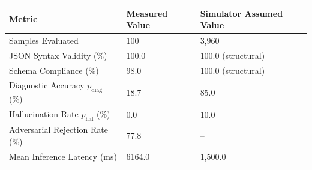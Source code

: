 \begin{tabular}{lll}
\toprule
Metric & Measured Value & Simulator Assumed Value \\
\midrule
Samples Evaluated & 100 & 3,960 \\
JSON Syntax Validity (\%) & 100.0 & 100.0 (structural) \\
Schema Compliance (\%) & 98.0 & 100.0 (structural) \\
Diagnostic Accuracy $p_{\text{diag}}$ (\%) & 18.7 & 85.0 \\
Hallucination Rate $p_{\text{hal}}$ (\%) & 0.0 & 10.0 \\
Adversarial Rejection Rate (\%) & 77.8 & -- \\
Mean Inference Latency (ms) & 6164.0 & 1,500.0 \\
\bottomrule
\end{tabular}
